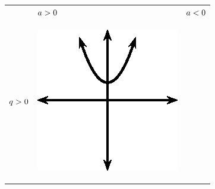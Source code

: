     \setlength\mytablespace{6\tabcolsep}
    \addtolength\mytablespace{4\arrayrulewidth}
    \setlength\mytablewidth{\linewidth}
    \setlength\mytableroom{\mytablewidth}
    \addtolength\mytableroom{-\mytablespace}
    \setlength\myfixedwidth{0pt}
    \setlength\mystarwidth{\mytableroom}
        \addtolength\mystarwidth{-\myfixedwidth}
        \divide{}
        \begin{center}
      \label{m39345*uid116}
    \noindent
      \tablelasttail{}
      \begin{xtabular*}{\mytablewidth}[t]{|p{10\mystarwidth}|p{10\mystarwidth}|p{10\mystarwidth}|}\hline
         &
                  $a>{}0$
                 &
                  $a<{}0$
     \tabularnewline{}
                  $q>{}0$
                 &
    \setcounter{subfigure}{0}
\label{m39345*id241967}
    \begin{center}
    \label{m39345*id241967!!!underscore!!!media}\label{m39345*id241967!!!underscore!!!printimage}\includegraphics[width=.3\columnwidth]{col11306.imgs/m39345_MG10C11_015.png} %

\end{center}
\end{xtabular*}
\end{center}
